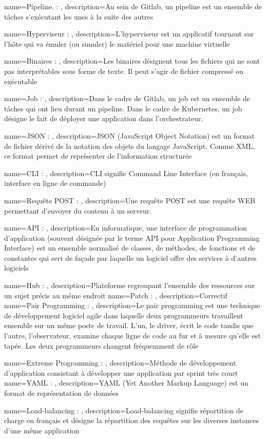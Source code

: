 {
    name=Pipeline. : ,
    description={Au sein de Gitlab, un pipeline est un ensemble de tâches s'exécutant les unes à la suite des autres}
}


{
    name=Hyperviseur : ,
    description={L’hyperviseur est un applicatif tournant sur l’hôte qui va émuler (ou simuler) le matériel pour une machine virtuelle}
}

{
    name=Binaires : ,
    description={Les binaires désignent tous les fichiers qui ne sont pas interprétables sous forme de texte. Il peut s'agir de fichier compressé ou exécutable}
}

{
    name=Job : ,
    description={Dans le cadre de Gitlab, un job est un ensemble de tâches qui ont lieu durant un pipeline. Dans le cadre de Kubernetes, un job désigne le fait de déployer une application dans l'orchestrateur.}
}

{
    name=JSON : ,
    description={JSON (JavaScript Object Notation) est un format de fichier dérivé de la notation des objets du langage JavaScript. Comme XML, ce format permet de représenter de l’information structurée}
}

{
    name=CLI : ,
    description={CLI signifie Command Line Interface (en français, interface en ligne de commande)}
}

{
    name=Requête POST : ,
    description={Une requête POST est une requête WEB permettant d'envoyer du contenu à un serveur.}
}

{
    name=API : ,
    description={En informatique, une interface de programmation d’application (souvent désignée par le terme API pour Application Programming Interface) est un ensemble normalisé de classes, de méthodes, de fonctions et de constantes qui sert de façade par laquelle un logiciel offre des services à d'autres logiciels}
}

{
    name=Hub : ,
    description={Plateforme regroupant l’ensemble des ressources sur un sujet précis au même endroit}
}
{
    name=Patch : ,
    description={Correctif}
}
{
    name=Pair Programming : ,
    description={Le pair programming est une technique de développement logiciel agile dans laquelle deux programmeurs travaillent ensemble sur un même poste de travail. L’un, le driver, écrit le code tandis que l’autre, l’observateur, examine chaque ligne de code au fur et à mesure qu’elle est tapée. Les deux programmeurs changent fréquemment de rôle}
}

{
    name=Extreme Programming : ,
    description={Méthode de développement d'application consistant à développer une application par sprint très court}
}
{
    name=YAML : ,
    description={YAML (Yet Another Markup Language) est un format de représentation de données}
}

{
    name=Load-balancing : ,
    description={Load-balancing signifie répartition de charge en français et désigne la répartition des requêtes sur les diverses instances d'une même application}
}
